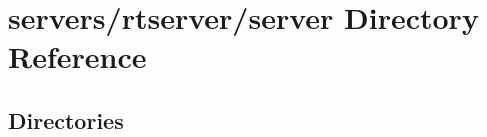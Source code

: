\section{servers/rtserver/server Directory Reference}
\label{dir_4fdb657650eefe149d78598e31f00bbe}
\subsection*{Directories}
\begin{DoxyCompactItemize}
\end{DoxyCompactItemize}

